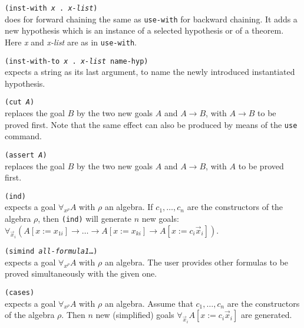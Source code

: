 \documentclass[12pt]{amsart}
\newcommand{\subst}[3]{#1[#2:= #3]}
\begin{document}
\texttt{(inst-with \textsl{x} . \textsl{x-list})}%
\\
does for forward chaining the same as \texttt{use-with} for backward
chaining.  It adds a new hypothesis which is an instance of a selected
hypothesis or of a theorem.
Here \textsl{x} and \textsl{x-list} are as in \texttt{use-with}.

\texttt{(inst-with-to \textsl{x} . \textsl{x-list} \texttt{name-hyp})}
\\
expects a string as its last argument, to name
the newly introduced instantiated hypothesis.

\texttt{(cut \textsl{A})}\\
replaces the goal $B$ by the two new goals $A$ and $A \to B$, with $A
\to B$ to be proved first.  Note that the same effect can also be
produced by means of the \texttt{use} command.

\texttt{(assert \textsl{A})}\\
replaces the goal $B$ by the two new goals $A$ and $A \to B$,
with $A$ to be proved first.

\texttt{(ind)}\\
expects a goal $\forall_{x^\rho} A$ with $\rho$ an algebra.  If $c_1,
\dots, c_n$ are the constructors of the algebra $\rho$, then
\texttt{(ind)} will generate $n$ new goals: \sloppy
$\forall_{\vec{x}_i} (\subst{A}{x}{x_{1i}} \to \dots \to
\subst{A}{x}{x_{ki}} \to \subst{A}{x}{c_i \vec{x}_i})$.

\texttt{(simind \textsl{all-formula1}\dots)}%
\\
expects a goal $\forall_{x^\rho} A$ with $\rho$ an algebra.  The user
provides other formulas to be proved simultaneously with the given
one.

\texttt{(cases)}\\
expects a goal $\forall_{x^\rho} A$ with $\rho$ an algebra.  Assume
that $c_1,\dots, c_n$ are the constructors of the algebra $\rho$.
Then $n$ new (simplified) goals $\forall_{\vec{x}_i} \subst{A}{x}{c_i
  \vec{x}_i}$ are
generated.
\end{document}
